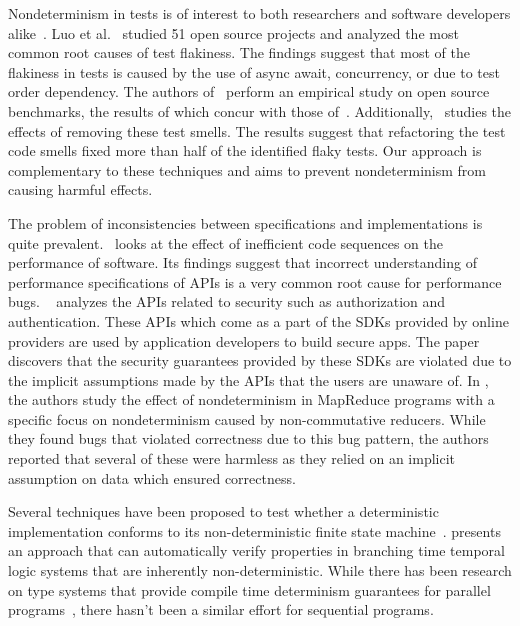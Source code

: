 Nondeterminism in tests is of interest to both
researchers and software developers alike~\cite{Fowler,Sudarshan}.
Luo et al.~\cite{LuoHEM2014} studied 51 open source projects and analyzed the most common root causes of
test flakiness. The findings suggest that most of the flakiness in tests is caused by
the use of async await, concurrency, or due to test order dependency. The authors of~\cite{Plotkin:1993:LPP:645891.671433}
perform an empirical study on open source benchmarks, the results of which concur with those of~\cite{LuoHEM2014}.
Additionally,~\cite{Plotkin:1993:LPP:645891.671433} studies the effects of removing these test smells. The results suggest that
refactoring the test code smells fixed more than half of the identified flaky tests. Our approach is complementary to
these techniques and aims to prevent nondeterminism from causing harmful effects. 


The problem of inconsistencies between specifications and implementations
is quite prevalent.~\cite{Jin:2012:UDR:2254064.2254075} looks at the effect of inefficient code sequences on the performance of software.
Its findings suggest that incorrect understanding of performance specifications of APIs is a very common root cause for
performance bugs. ~\cite{Rui:2013:180377} analyzes the APIs related to security such as authorization and authentication.
These APIs which come as a part of the SDKs provided by online providers are used by application developers to 
build secure apps. The paper discovers that the security guarantees provided by these SDKs are violated due to
the implicit assumptions made by the APIs that the users are unaware of. In \cite{Xiao:2014:NMC:2591062.2591177},
the authors
study the effect of nondeterminism in MapReduce programs with a specific focus on nondeterminism caused by
non-commutative reducers. While they found bugs that violated correctness due to this bug pattern,
the authors reported that several of these were harmless as they relied on an implicit assumption on data
which ensured correctness. 

Several techniques have been proposed to test whether a
deterministic implementation conforms to its non-deterministic finite state machine~\cite{Petrenko1996,Petrenko:1993:NSM:648128.761244,Savor:1997:639710,Hierons:2004:TCD:1040993.1040998}.
\cite{Cook:2013:RNP:2491956.2491969} presents an approach that can automatically verify properties
in branching time temporal logic systems that are inherently non-deterministic. While there has been research on type systems that provide compile time determinism guarantees for parallel programs~\cite{Bocchino:2009:TES:1640089.1640097,Bocchino:2011:SND:1926385.1926447},
there hasn't been a similar effort for sequential programs.

